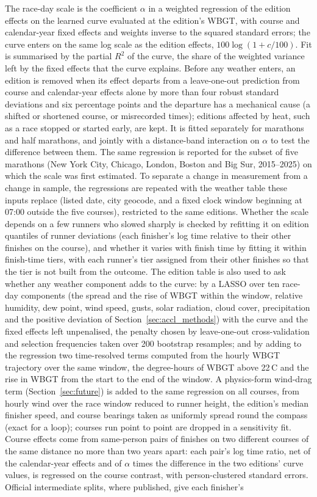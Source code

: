 \documentclass[11pt]{article}
\renewcommand{\_}{\textunderscore\allowbreak}
\begin{document}
The race-day scale is the coefficient $\alpha$ in a weighted regression of the edition effects on the learned curve evaluated at the edition's WBGT, with course and calendar-year fixed effects and weights inverse to the squared standard errors; the curve enters on the same log scale as the edition effects, $100\log(1 + c/100)$. Fit is summarised by the partial $R^2$ of the curve, the share of the weighted variance left by the fixed effects that the curve explains. Before any weather enters, an edition is removed when its effect departs from a leave-one-out prediction from course and calendar-year effects alone by more than four robust standard deviations and six percentage points and the departure has a mechanical cause (a shifted or shortened course, or misrecorded times); editions affected by heat, such as a race stopped or started early, are kept. It is fitted separately for marathons and half marathons, and jointly with a distance-band interaction on $\alpha$ to test the difference between them. The same regression is reported for the subset of five marathons (New York City, Chicago, London, Boston and Big Sur, 2015--2025) on which the scale was first estimated. To separate a change in measurement from a change in sample, the regressions are repeated with the weather table these inputs replace (listed date, city geocode, and a fixed clock window beginning at 07:00 outside the five courses), restricted to the same editions. Whether the scale depends on a few runners who slowed sharply is checked by refitting it on edition quantiles of runner deviations (each finisher's log time relative to their other finishes on the course), and whether it varies with finish time by fitting it within finish-time tiers, with each runner's tier assigned from their other finishes so that the tier is not built from the outcome. The edition table is also used to ask whether any weather component adds to the curve: by a LASSO over ten race-day components (the spread and the rise of WBGT within the window, relative humidity, dew point, wind speed, gusts, solar radiation, cloud cover, precipitation and the positive deviation of Section~\ref{sec:accl_methods}) with the curve and the fixed effects left unpenalised, the penalty chosen by leave-one-out cross-validation and selection frequencies taken over 200 bootstrap resamples; and by adding to the regression two time-resolved terms computed from the hourly WBGT trajectory over the same window, the degree-hours of WBGT above 22\,\textdegree C and the rise in WBGT from the start to the end of the window. A physics-form wind-drag term (Section~\ref{sec:future}) is added to the same regression on all courses, from hourly wind over the race window reduced to runner height, the edition's median finisher speed, and course bearings taken as uniformly spread round the compass (exact for a loop); courses run point to point are dropped in a sensitivity fit. Course effects come from same-person pairs of finishes on two different courses of the same distance no more than two years apart: each pair's log time ratio, net of the calendar-year effects and of $\alpha$ times the difference in the two editions' curve values, is regressed on the course contrast, with person-clustered standard errors. Official intermediate splits, where published, give each finisher's 
\end{document}
